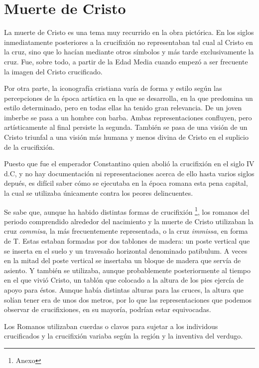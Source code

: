 \section{Muerte de Cristo}
La muerte de Cristo es una tema muy recurrido en la obra pictórica. En los siglos inmediatamente posteriores a la crucifixión no representaban tal cual al Cristo en la cruz, sino que lo hacían mediante otros símbolos y más tarde exclusivamente la cruz. Fue, sobre todo, a partir de la Edad Media cuando empezó a ser frecuente la imagen del Cristo crucificado.

Por otra parte, la iconografía cristiana varía de forma y estilo según las percepciones de la época artística en la que se desarrolla, en la que predomina un estilo determinado, pero en todas ellas ha tenido gran relevancia. De un joven imberbe se pasa a un hombre con barba. Ambas representaciones confluyen, pero artísticamente al final persiste la segunda. También se pasa de una visión de un Cristo triunfal a una visión más humana y menos divina de Cristo en el suplicio de la crucifixión.

Puesto que fue el emperador Constantino quien abolió la crucifixión en el siglo IV d.C, y no hay documentación ni representaciones acerca de ello hasta varios siglos depués, es difícil saber cómo se ejecutaba en la época romana esta pena capital, la cual se utilizaba únicamente contra los peores delincuentes.

Se sabe que, aunque ha habido distintas formas de crucifixión \footnote{Anexo}, los romanos del periodo comprendido alrededor del nacimiento y la muerte de Cristo utilizaban la cruz \textit{commisa}, la más frecuentemente representada, o la cruz \textit{immissa}, en forma de T. Estas estaban formadas por dos tablones de madera: un poste vertical que se inserta en el suelo y un travesaño horizontal denominado patibulum. A veces en la mitad del poste vertical se insertaba un bloque de madera que servía de asiento. Y también se utilizaba, aunque probablemente posteriormente al tiempo en el que vivió Cristo, un tablón que colocado a la altura de los pies ejercía de apoyo para éstos. Aunque había distintas alturas para las cruces, la altura que solían tener era de unos dos metros, por lo que las representaciones que podemos observar de crucifixiones, en su mayoría, podrían estar equivocadas.

Los Romanos utilizaban cuerdas o clavos para sujetar a los individous crucificados y la crucifixión variaba según la región y la inventiva del verdugo.

